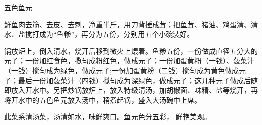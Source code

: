 \begin{recipe}[五福鱼元]{五色鱼元}

\ingredients


\cooking

\step 鲜鱼肉去筋、去皮、去刺，净重半斤，用刀背捶成茸；把鱼茸、猪油、鸡蛋清、清水、盐搅打成为“鱼糁”，再分为五份，分别用五个小碗装好。

\step 锅放炉上，倒入清水，烧开后移到微火上煨着。鱼糁五份，一份做成直径五分大的元子；一份加红食色，揽匀成粉红色，做成元子；一份加蛋黄粉（一钱）、菠菜汁（一钱）搅匀成为绿色，做成元子;一份加蛋黄粉（二钱〕搅匀成为黄色做成元子；最后一份加菠菜汁（四钱）搅匀成为深绿色，做成元子；这几种元子做成后随即放入开水中。另把炒锅放炉上，放入特级清汤，加胡椒面、味精、盐等烧开，再将开水中的五色鱼元放入汤中，稍煮起锅，盛入大汤碗中上席。

\notes

此菜系清汤菜，汤清如水，味鲜爽口。鱼元色分五彩， 鲜艳美观。

\end{recipe}

